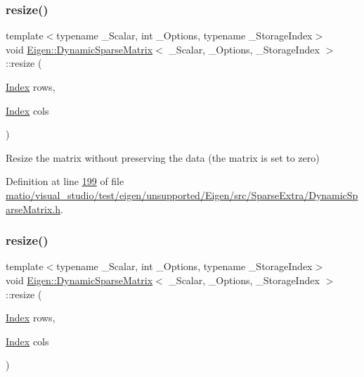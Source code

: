 \subsubsection{\texorpdfstring{resize()}{resize()}\hspace{0.1cm}{\footnotesize\ttfamily [1/2]}}
{\footnotesize\ttfamily template$<$typename \+\_\+\+Scalar, int \+\_\+\+Options, typename \+\_\+\+Storage\+Index$>$ \\
void \hyperlink{class_eigen_1_1_dynamic_sparse_matrix}{Eigen\+::\+Dynamic\+Sparse\+Matrix}$<$ \+\_\+\+Scalar, \+\_\+\+Options, \+\_\+\+Storage\+Index $>$\+::resize (\begin{DoxyParamCaption}\item[{\hyperlink{group___core___module_a554f30542cc2316add4b1ea0a492ff02}{Index}}]{rows,  }\item[{\hyperlink{group___core___module_a554f30542cc2316add4b1ea0a492ff02}{Index}}]{cols }\end{DoxyParamCaption})\hspace{0.3cm}{\ttfamily [inline]}}

Resize the matrix without preserving the data (the matrix is set to zero) 

Definition at line \hyperlink{matio_2visual__studio_2test_2eigen_2unsupported_2_eigen_2src_2_sparse_extra_2_dynamic_sparse_matrix_8h_source_l00199}{199} of file \hyperlink{matio_2visual__studio_2test_2eigen_2unsupported_2_eigen_2src_2_sparse_extra_2_dynamic_sparse_matrix_8h_source}{matio/visual\+\_\+studio/test/eigen/unsupported/\+Eigen/src/\+Sparse\+Extra/\+Dynamic\+Sparse\+Matrix.\+h}.

\mbox{\label{class_eigen_1_1_dynamic_sparse_matrix_a2d793e836fdb4bf0a85c9cf390e07861}} 
\subsubsection{\texorpdfstring{resize()}{resize()}\hspace{0.1cm}{\footnotesize\ttfamily [2/2]}}
{\footnotesize\ttfamily template$<$typename \+\_\+\+Scalar, int \+\_\+\+Options, typename \+\_\+\+Storage\+Index$>$ \\
void \hyperlink{class_eigen_1_1_dynamic_sparse_matrix}{Eigen\+::\+Dynamic\+Sparse\+Matrix}$<$ \+\_\+\+Scalar, \+\_\+\+Options, \+\_\+\+Storage\+Index $>$\+::resize (\begin{DoxyParamCaption}\item[{\hyperlink{group___core___module_a554f30542cc2316add4b1ea0a492ff02}{Index}}]{rows,  }\item[{\hyperlink{group___core___module_a554f30542cc2316add4b1ea0a492ff02}{Index}}]{cols }\end{DoxyParamCaption})\hspace{0.3cm}{\ttfamily [inline]}}

